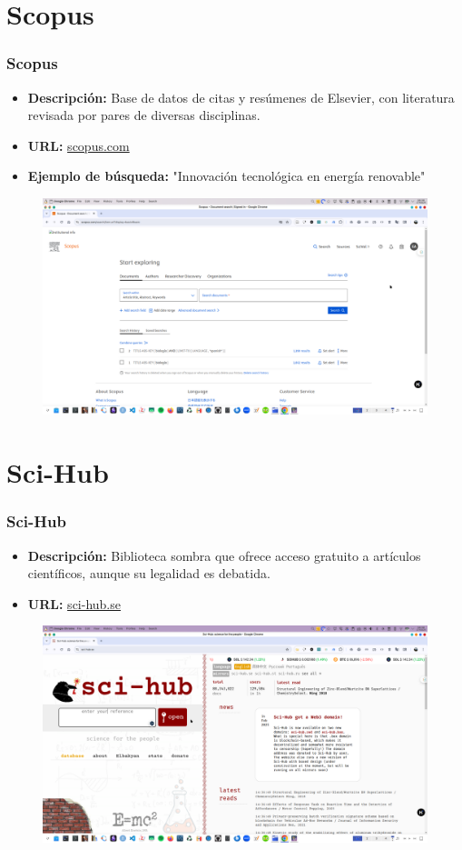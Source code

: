 \documentclass[
11pt, %
]{beamer}
\begin{document}
\section{Scopus}
\begin{frame}
	\frametitle{Scopus}
	\begin{itemize}
		\item \textbf{Descripción:} Base de datos de citas y resúmenes de Elsevier, con literatura revisada por pares de diversas disciplinas.
		\item \textbf{URL:} \href{https://www.scopus.com}{scopus.com}
		\item \textbf{Ejemplo de búsqueda:} "Innovación tecnológica en energía renovable"
	\end{itemize}
					\begin{figure}
		\centering
		\includegraphics[width=0.9\linewidth]{images/scopus.png}
		\label{fig:screenshot010}
	\end{figure}
\end{frame}

\section{Sci-Hub}
\begin{frame}
	\frametitle{Sci-Hub}
	\begin{itemize}
		\item \textbf{Descripción:} Biblioteca sombra que ofrece acceso gratuito a artículos científicos, aunque su legalidad es debatida.
		\item \textbf{URL:} \href{https://sci-hub.se}{sci-hub.se}
	\end{itemize}
						\begin{figure}
		\centering
		\includegraphics[width=0.9\linewidth]{images/scihub.png}
		\label{fig:screenshot010}
	\end{figure}
\end{frame}
\end{document}
